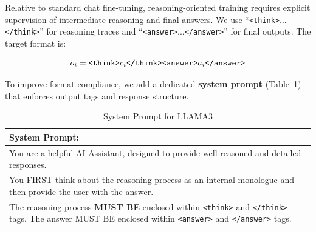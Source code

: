 Relative to standard chat fine-tuning, reasoning-oriented training requires explicit supervision of intermediate reasoning and final answers. We use ``\texttt{<think>}...\texttt{</think>}'' for reasoning traces and ``\texttt{<answer>}...\texttt{</answer>}'' for final outputs. The target format is:



\begin{equation*}
    o_i = \text{\texttt{<think>}}c_i\text{\texttt{</think>}}\text{\texttt{<answer>}}a_i\text{\texttt{</answer>}}
\end{equation*}


To improve format compliance, we add a dedicated \textbf{system prompt} (Table~\ref{tab:ch2:system_prompt}) that enforces output tags and response structure.

\begin{table}[h]
    \centering
    \footnotesize
    \begin{tabular}{p{}}
    \toprule
    \textbf{System Prompt:} \\
    \midrule
      You are a helpful AI Assistant, designed to provide well-reasoned and detailed responses. \\
  You FIRST think about the reasoning process as an internal monologue and then provide the user with the answer.  \\
  The reasoning process \textbf{MUST BE} enclosed within \texttt{<think>} and \texttt{</think>} tags. The answer MUST BE enclosed within \texttt{<answer>} and \texttt{</answer>} tags. \\
    \bottomrule
    \end{tabular}
    \caption{System Prompt for LLAMA3}
    \label{tab:ch2:system_prompt}
\end{table}




